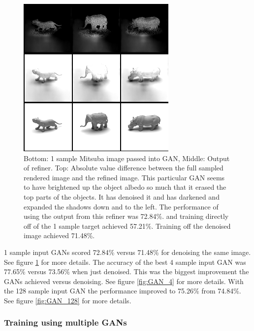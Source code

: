 \documentclass[10pt,twocolumn,letterpaper]{article}
\begin{document}
\begin{figure}[h!]
\centering
\includegraphics[width=1.0\columnwidth]{./assets/1sampleGANComparison_72_84.png}
\caption{Bottom: 1 sample Mitsuba image passed into GAN, Middle: Output of refiner.  Top: Absolute value difference between the full sampled rendered image and the refined image. This particular GAN seems to have brightened up the object albedo so much that it erased the top parts of the objects. It has denoised it and has darkened and expanded the shadows down and to the left.  The performance of using the output from this refiner was 72.84\%. and training directly off of the 1 sample target achieved 57.21\%.  Training off the denoised image achieved 71.48\%.}
\label{fig:GAN_1}
\end{figure}
1 sample input GANs scored 72.84\% versus 71.48\% for denoising the same image. See figure \ref{fig:GAN_1} for more details.  The accuracy of the best 4 sample input GAN was 77.65\% versus 73.56\% when just denoised. This was the biggest improvement the GANs achieved versus denoising. See figure \ref{fig:GAN_4} for more details.  With the 128 sample input GAN the performance improved to 75.26\% from 74.84\%. See figure \ref{fig:GAN_128} for more details. \\

\subsubsection{Training using multiple GANs} \label{sec:multigans}
\end{document}
